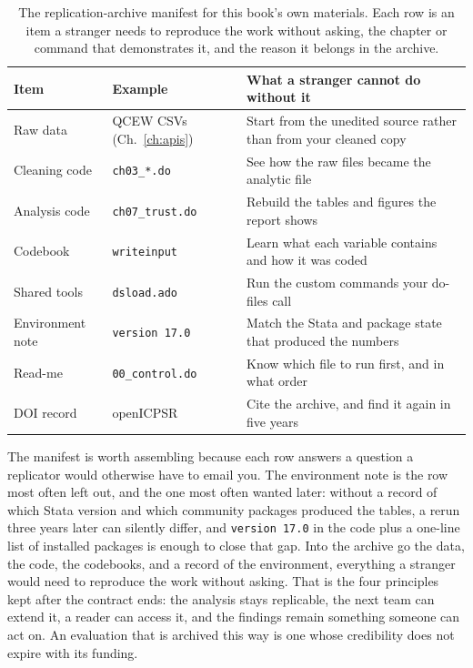 \begin{table}[htbp]
\centering
\caption[A replication-archive manifest]{The replication-archive manifest for this book's own materials. Each row is an item a stranger needs to reproduce the work without asking, the chapter or command that demonstrates it, and the reason it belongs in the archive.}
\label{tab:manifest}
\begin{tabular}{@{}p{3.0cm}p{3.4cm}p{8.4cm}@{}}
\hline
Item & Example & What a stranger cannot do without it \\
\hline
Raw data          & QCEW CSVs (Ch.~\ref{ch:apis})  & Start from the unedited source rather than from your cleaned copy \\
Cleaning code     & \texttt{ch03\_*.do}  & See how the raw files became the analytic file \\
Analysis code     & \texttt{ch07\_trust.do} & Rebuild the tables and figures the report shows \\
Codebook          & \texttt{writeinput}  & Learn what each variable contains and how it was coded \\
Shared tools      & \texttt{dsload.ado}  & Run the custom commands your do-files call \\
Environment note  & \texttt{version 17.0} & Match the Stata and package state that produced the numbers \\
Read-me           & \texttt{00\_control.do} & Know which file to run first, and in what order \\
DOI record        & openICPSR            & Cite the archive, and find it again in five years \\
\hline
\end{tabular}
\end{table}

The manifest is worth assembling because each row answers a question a replicator would otherwise have to email you. The environment note is the row most often left out, and the one most often wanted later: without a record of which Stata version and which community packages produced the tables, a rerun three years later can silently differ, and \texttt{version 17.0} in the code plus a one-line list of installed packages is enough to close that gap. Into the archive go the data, the code, the codebooks, and a record of the environment, everything a stranger would need to reproduce the work without asking. That is the four principles kept after the contract ends: the analysis stays replicable, the next team can extend it, a reader can access it, and the findings remain something someone can act on. An evaluation that is archived this way is one whose credibility does not expire with its funding.

